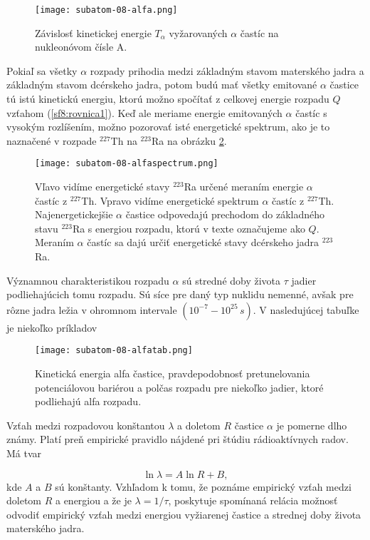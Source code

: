 \documentclass[../../main.tex]{subfiles}
\begin{document}
\begin{figure}[!h]
\texttt{[image: subatom-08-alfa.png]}
\centering
\caption{Závislosť kinetickej energie $T_{\alpha}$ vyžarovaných $\alpha$ častíc na nukleonóvom čísle A.}
\label{sf8:fig:alfa}
\end{figure}

Pokiaľ sa všetky $\alpha$ rozpady prihodia medzi základným stavom materského jadra a základným stavom dcérskeho jadra, potom budú mať všetky emitované $\alpha$ častice tú istú kinetickú energiu, ktorú možno spočítať z celkovej energie rozpadu $Q$ vzťahom (\ref{sf8:rovnica1}). Keď ale meriame energie emitovaných $\alpha$ častíc s vysokým rozlíšením, možno pozorovať isté energetické spektrum, ako je to naznačené v rozpade $^{227}$Th na $^{223}$Ra na obrázku \ref{sf8:fig:alfaspectrum}.

\begin{figure}[!h]
\texttt{[image: subatom-08-alfaspectrum.png]}
\centering
\caption{Vľavo vidíme energetické stavy $^{223}$Ra určené meraním energie $\alpha$ častíc z $^{227}$Th. Vpravo vidíme energetické spektrum $\alpha$ častíc z $^{227}$Th. Najenergetickejšie $\alpha$ častice odpovedajú prechodom do základného stavu $^{223}$Ra s energiou rozpadu, ktorú v texte označujeme ako $Q$. Meraním $\alpha$ častíc sa dajú určiť energetické stavy dcérskeho jadra $^{223}$Ra.}
\label{sf8:fig:alfaspectrum}
\end{figure}

Významnou charakteristikou rozpadu $\alpha$ sú stredné doby života $\tau$ jadier podliehajúcich tomu rozpadu. Sú síce pre daný typ nuklidu nemenné, avšak pre rôzne jadra ležia v ohromnom intervale $(10^{-7}-10^{25}\,\unit{s})$.
V nasledujúcej tabuľke je niekoľko príkladov

\begin{figure}[!h]
\texttt{[image: subatom-08-alfatab.png]}
\centering
\caption{Kinetická energia alfa častice, pravdepodobnosť pretunelovania potenciálovou bariérou a polčas rozpadu pre niekoľko jadier, ktoré podliehajú alfa rozpadu.}
\label{sf8:fig:alfatab}
\end{figure}

Vzťah medzi rozpadovou konštantou $\lambda$ a doletom $R$ častice $\alpha$ je pomerne dlho známy. Platí preň empirické pravidlo nájdené pri štúdiu rádioaktívnych radov. Má tvar

$$ \ln \lambda = A \ln R + B, $$
kde $A$ a $B$ sú konštanty. Vzhľadom k tomu, že poznáme empirický vzťah medzi doletom $R$ a energiou a že je $\lambda = 1 / \tau$, poskytuje spomínaná relácia možnosť odvodiť empirický vzťah medzi energiou vyžiarenej častice a strednej doby života materského jadra.
\end{document}
